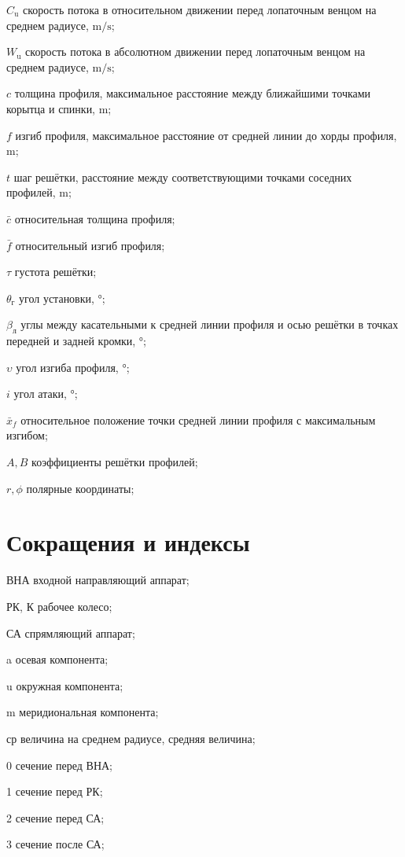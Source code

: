 \begin{eqexpl}
\item{\(C_{\text{u}}\)} скорость потока в относительном движении перед лопаточным венцом на среднем радиусе, $\si\meter/\si\second$;
\item{\(W_{\text{u}}\)} скорость потока в абсолютном движении перед лопаточным венцом на среднем радиусе, $\si\meter/\si\second$;
\item{\(c\)}  толщина профиля, максимальное расстояние между ближайшими точками корытца и спинки, \(\si\meter\); 
\item{\(f\)} изгиб профиля, максимальное расстояние от средней линии до хорды профиля, \(\si\meter\);
\item{\(t\)} шаг решётки, расстояние между соответствующими точками соседних профилей, \(\si\meter\);
\item{\(\bar{c}\)} относительная толщина профиля; 
\item{\(\bar{f}\)} относительный изгиб профиля;
\item{\(\tau\)} густота решётки;
\item{\(\theta_{\text{г}}\)} угол установки, \(\si\degree\); 
\item{\(\beta_\text{л}\)} углы между касательными к средней линии профиля и осью решётки в точках передней и задней кромки, \(\si\degree\);
\item{\(\upsilon\)} угол изгиба профиля, \(\si\degree\);
\item{\(i\)} угол атаки, \(\si\degree\);
\item{\(\bar{x}_f\)} относительное положение точки средней линии профиля с максимальным изгибом;
\item{\(A, B\)} коэффициенты решётки профилей;
\item{\(r, \phi\)} полярные координаты;

\end{eqexpl}

\section*{Сокращения и индексы}
\begin{eqexpl}

\item{ВНА} входной направляющий аппарат;
\item{РК, К} рабочее колесо;
\item{СА} спрямляющий аппарат;
\item{a} осевая компонента;
\item{u} окружная компонента;
\item{m} меридиональная компонента;
\item{ср} величина на среднем радиусе, средняя величина;
\item{0} сечение перед ВНА;
\item{1} сечение перед РК;
\item{2} сечение перед СА;
\item{3} сечение после СА;

\end{eqexpl}

\FloatBarrier